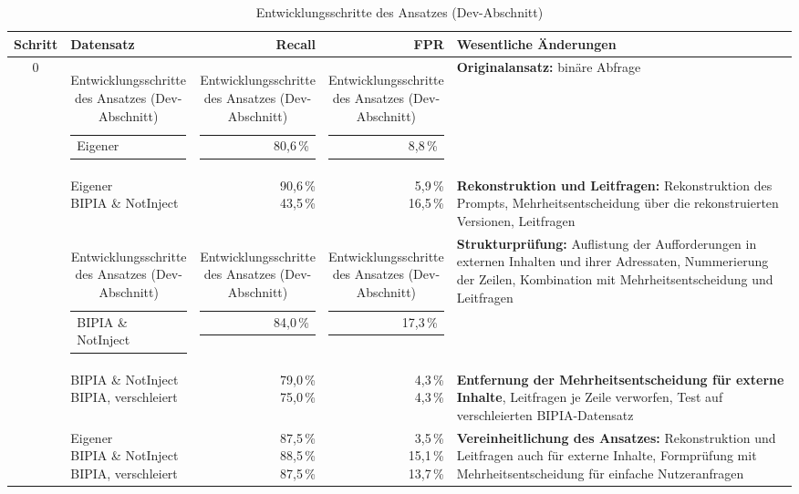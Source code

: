 \begin{table}[htbp]
\centering
\footnotesize
\newcommand{\zl}[1]{\begin{tabular}[t]{@{}l@{}}#1\end{tabular}}
\newcommand{\zr}[1]{\begin{tabular}[t]{@{}r@{}}#1\end{tabular}}
\caption{Entwicklungsschritte des Ansatzes (Dev-Abschnitt)}
\label{tab:entwicklung_ansatz}
\begin{tabularx}{\textwidth}{c l r r >{\raggedright\arraybackslash}X}
\toprule
\textbf{Schritt} & \textbf{Datensatz} & \textbf{Recall} & \textbf{FPR} & \textbf{Wesentliche Änderungen} \\
\midrule
0 & \zl{Eigener} & \zr{80,6\,\%} & \zr{8,8\,\%} &
    \textbf{Originalansatz:} binäre Abfrage \\
\addlinespace
1 & \zl{Eigener\\ BIPIA \& NotInject} & \zr{90,6\,\%\\ 43,5\,\%} & \zr{5,9\,\%\\ 16,5\,\%} &
    \textbf{Rekonstruktion und Leitfragen:} Rekonstruktion des Prompts, Mehrheitsentscheidung
    über die rekonstruierten Versionen, Leitfragen \\
\addlinespace
2 & \zl{BIPIA \& NotInject} & \zr{84,0\,\%} & \zr{17,3\,\%} &
    \textbf{Strukturprüfung:} Auflistung der Aufforderungen in externen Inhalten und ihrer
    Adressaten, Nummerierung der Zeilen, Kombination mit Mehrheitsentscheidung und Leitfragen \\
\addlinespace
3 & \zl{BIPIA \& NotInject\\ BIPIA, verschleiert} & \zr{79,0\,\%\\ 75,0\,\%} & \zr{4,3\,\%\\ 4,3\,\%} &
    \textbf{Entfernung der Mehrheitsentscheidung für externe Inhalte}, Leitfragen je Zeile verworfen,
    Test auf verschleierten BIPIA-Datensatz \\
\addlinespace
4 & \zl{Eigener\\ BIPIA \& NotInject\\ BIPIA, verschleiert} & \zr{87,5\,\%\\ 88,5\,\%\\ 87,5\,\%} & \zr{3,5\,\%\\ 15,1\,\%\\ 13,7\,\%} &
    \textbf{Vereinheitlichung des Ansatzes:} Rekonstruktion und Leitfragen auch für externe Inhalte,
    Formprüfung mit Mehrheitsentscheidung für einfache Nutzeranfragen \\
\bottomrule
\end{tabularx}
\end{table}


